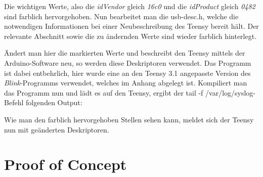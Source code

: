 

Die wichtigen Werte, also die \textit{idVendor} gleich \textit{16c0} und die \textit{idProduct} gleich \textit{0482} sind farblich hervorgehoben. Nun bearbeitet man die usb-desc.h, welche die notwendigen Informationen bei einer Neubeschreibung des Teensy bereit hält. Der relevante Abschnitt sowie die zu ändernden Werte sind wieder farblich hinterlegt.

%

Ändert man hier die markierten Werte und beschreibt den Teensy mittels der Arduino-Software neu, so werden diese Deskriptoren verwendet. Das Programm ist dabei entbehrlich, hier wurde eine an den Teensy 3.1 angepasste Version des \textit{Blink}-Programms verwendet, welches im Anhang abgelegt ist. Kompiliert man das Programm nun und lädt es auf den Teensy, ergibt der \glqq tail -f /var/log/syslog\grqq -Befehl folgenden Output:



Wie man den farblich hervorgehoben Stellen sehen kann, meldet sich der Teensy nun mit geänderten Deskriptoren.


\section{Proof of Concept} \label{PoC}